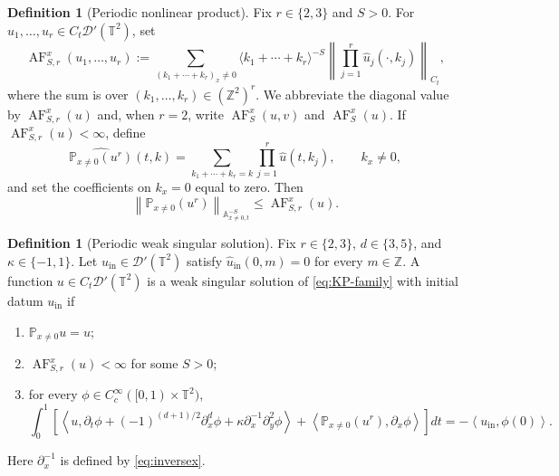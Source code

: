 \documentclass[12pt,reqno,letterpaper]{amsart}
\numberwithin{equation}{section}
\theoremstyle{definition}
\newtheorem{definition}[theorem]{Definition}
\newcommand{\T}{\mathbb T}
\newcommand{\Z}{\mathbb Z}
\newcommand{\A}{\mathbb A}
\newcommand{\ip}[2]{\left\langle #1,#2\right\rangle}
\newcommand{\norm}[1]{\left\lVert #1\right\rVert}
\begin{document}
\begin{definition}[Periodic nonlinear product]
\label{def:Q}
Fix $r\in\{2,3\}$ and $S>0$.  For
$u_1,\ldots,u_r\in C_t\mathcal D'(\T^2)$, set
\begin{equation}\label{eq:periodic-AF}
 \operatorname{AF}_{S,r}^x(u_1,\ldots,u_r)
 :=\sum_{(k_1+\cdots+k_r)_x\neq0}
 \langle k_1+\cdots+k_r\rangle^{-S}
 \norm{\prod_{j=1}^r\widehat u_j(\cdot,k_j)}_{C_t},
\end{equation}
where the sum is over $(k_1,\ldots,k_r)\in(\Z^2)^r$.  We abbreviate
the diagonal value by $\operatorname{AF}_{S,r}^x(u)$ and, when $r=2$,
write $\operatorname{AF}_S^x(u,v)$ and $\operatorname{AF}_S^x(u)$.
If $\operatorname{AF}_{S,r}^x(u)<\infty$, define
\begin{equation}\label{eq:periodic-product}
 \widehat{\mathbb P_{x\neq0}(u^r)}(t,k)
 =\sum_{k_1+\cdots+k_r=k}\prod_{j=1}^r\widehat u(t,k_j),
 \qquad k_x\neq0,
\end{equation}
and set the coefficients on $k_x=0$ equal to zero.  Then
\begin{equation}\label{eq:Nbound}
 \norm{\mathbb P_{x\neq0}(u^r)}_{\A^{-S}_{x\neq0,t}}
 \leq\operatorname{AF}_{S,r}^x(u).
\end{equation}
\end{definition}

\begin{definition}[Periodic weak singular solution]
\label{def:singularsolution}
Fix $r\in\{2,3\}$, $d\in\{3,5\}$, and $\kappa\in\{-1,1\}$.
Let $u_{\mathrm{in}}\in\mathcal D'(\T^2)$ satisfy
$\widehat u_{\mathrm{in}}(0,m)=0$ for every $m\in\Z$.  A function
$u\in C_t\mathcal D'(\T^2)$ is a weak singular solution of
\eqref{eq:KP-family} with initial datum $u_{\mathrm{in}}$ if
\begin{enumerate}[label=\textup{(\roman*)}]
 \item $\mathbb P_{x\neq0}u=u$;
 \item $\operatorname{AF}_{S,r}^x(u)<\infty$ for some $S>0$;
 \item for every $\phi\in C_c^\infty([0,1)\times\T^2)$,
 \begin{equation}\label{eq:weakform}
  \int_0^1\left[
   \ip{u}{\partial_t\phi+(-1)^{(d+1)/2}\partial_x^d\phi
    +\kappa\partial_x^{-1}\partial_y^2\phi}
   +\ip{\mathbb P_{x\neq0}(u^r)}{\partial_x\phi}
  \right]dt
  =-\ip{u_{\mathrm{in}}}{\phi(0)}.
 \end{equation}
\end{enumerate}
Here $\partial_x^{-1}$ is defined by \eqref{eq:inversex}.
\end{definition}
\end{document}
